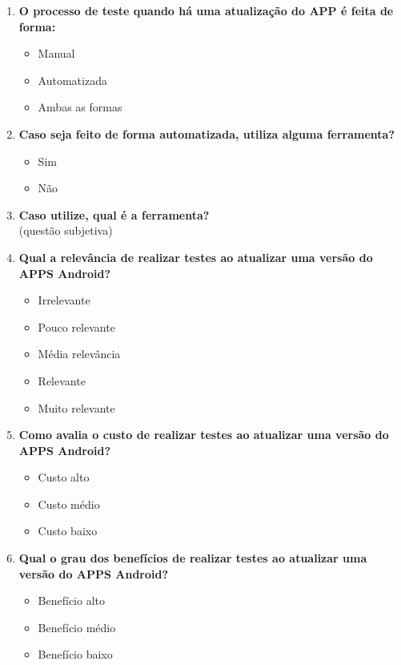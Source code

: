 \begin{enumerate}[label=\bf A\arabic*,leftmargin=1.8cm]
\begin{enumerate}[label= \arabic*]
     \item \textbf{O processo de teste quando há uma atualização do APP é feita de forma:}
     \begin{itemize}
         \item Manual
         \item Automatizada
         \item Ambas as formas
     \end{itemize}
     
    \item \textbf{Caso seja feito de forma automatizada, utiliza alguma ferramenta?}
    \begin{itemize}
        \item Sim
        \item Não
    \end{itemize}
    
    \item \textbf{Caso utilize, qual é a ferramenta?}\\
    (questão subjetiva)
    
    \item \textbf{Qual a relevância de realizar testes ao atualizar uma versão do \ac{APPS} Android?}
    \begin{itemize}
        \item Irrelevante
        \item Pouco relevante
        \item Média relevância
        \item Relevante
        \item Muito relevante
    \end{itemize}
  
    \item \textbf{Como avalia o custo de realizar testes ao atualizar uma versão do \ac{APPS} Android?}
    \begin{itemize}
        \item Custo alto
        \item Custo médio
        \item Custo baixo
    \end{itemize} 

    \item \textbf{Qual o grau dos benefícios de realizar testes ao atualizar uma versão do \ac{APPS} Android?}
    \begin{itemize}
        \item Benefício alto
        \item Benefício médio
        \item Benefício baixo
    \end{itemize}


\end{enumerate}
\end{enumerate}
